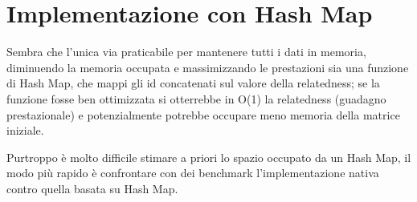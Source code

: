 \section{Implementazione con Hash Map}
Sembra che l'unica via praticabile per mantenere tutti i dati in memoria, diminuendo la memoria occupata e massimizzando le prestazioni sia una funzione di Hash Map, 
che mappi gli id concatenati sul valore della relatedness; se la funzione fosse ben ottimizzata si otterrebbe in O(1) la relatedness (guadagno prestazionale)
e potenzialmente potrebbe occupare meno memoria della matrice iniziale.

Purtroppo è molto difficile stimare a priori lo spazio occupato da un Hash Map, 
il modo più rapido è confrontare con dei benchmark l'implementazione nativa contro quella basata su Hash Map.

